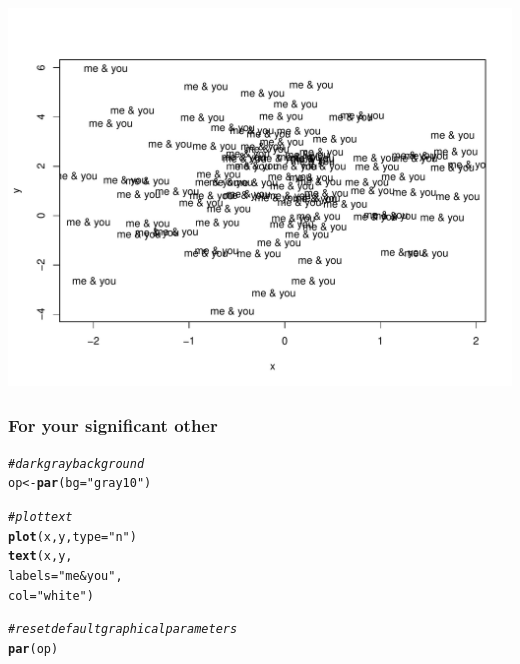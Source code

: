 \documentclass[12pt]{beamer}\usepackage[]{graphicx}\usepackage[]{color}
\makeatletter
\def\maxwidth{ %
  \ifdim\Gin@nat@width>\linewidth
    \linewidth
  \else
    \Gin@nat@width
  \fi
}
\newcommand{\hlstr}[1]{\textcolor[rgb]{0.192,0.494,0.8}{#1}}%
\newcommand{\hlcom}[1]{\textcolor[rgb]{0.678,0.584,0.686}{\textit{#1}}}%
\newcommand{\hlstd}[1]{\textcolor[rgb]{0.345,0.345,0.345}{#1}}%
\newcommand{\hlkwb}[1]{\textcolor[rgb]{0.69,0.353,0.396}{#1}}%
\newcommand{\hlkwc}[1]{\textcolor[rgb]{0.333,0.667,0.333}{#1}}%
\newcommand{\hlkwd}[1]{\textcolor[rgb]{0.737,0.353,0.396}{\textbf{#1}}}%
\newenvironment{kframe}{%
 \def\at@end@of@kframe{}%
 \ifinner\ifhmode%
  \def\at@end@of@kframe{\end{minipage}}%
  \begin{minipage}{\columnwidth}%
 \fi\fi%
 \def\FrameCommand##1{\hskip\@totalleftmargin \hskip-\fboxsep
 \colorbox{shadecolor}{##1}\hskip-\fboxsep
     \hskip-\linewidth \hskip-\@totalleftmargin \hskip\columnwidth}%
 \MakeFramed {\advance\hsize-\width
   \@totalleftmargin\z@ \linewidth\hsize
   \@setminipage}}%
 {\par\unskip\endMakeFramed%
 \at@end@of@kframe}
\newenvironment{knitrout}{}{} %
\makeatother
\begin{document}
\begin{frame}[fragile]

\begin{knitrout}
\color{fgcolor}
\includegraphics[width=\maxwidth]{figure/me-and-you1-1} 

\end{knitrout}

\end{frame}


\begin{frame}[fragile]
\frametitle{For your significant other}

\begin{knitrout}\footnotesize
{}\color{fgcolor}\begin{kframe}
\begin{alltt}
\hlcom{# dark gray background}
\hlstd{op} \hlkwb{<-} \hlkwd{par}\hlstd{(}\hlkwc{bg} \hlstd{=} \hlstr{"gray10"}\hlstd{)}

\hlcom{# plot text}
\hlkwd{plot}\hlstd{(x, y,} \hlkwc{type} \hlstd{=} \hlstr{"n"}\hlstd{)}
\hlkwd{text}\hlstd{(x, y,}
     \hlkwc{labels} \hlstd{=} \hlstr{"me & you"}\hlstd{,}
     \hlkwc{col} \hlstd{=} \hlstr{"white"}\hlstd{)}

\hlcom{# reset default graphical parameters}
\hlkwd{par}\hlstd{(op)}
\end{alltt}
\end{kframe}
\end{knitrout}

\end{frame}
\end{document}
